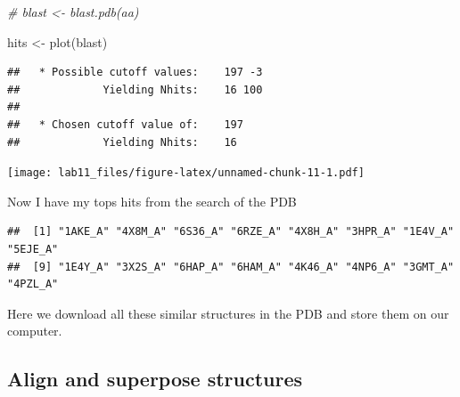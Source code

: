\documentclass[
]{article}
\newenvironment{Shaded}{\begin{snugshade}}{\end{snugshade}}
\newcommand{\CommentTok}[1]{\textcolor[rgb]{0.56,0.35,0.01}{\textit{#1}}}
\newcommand{\FunctionTok}[1]{\textcolor[rgb]{0.00,0.00,0.00}{#1}}
\newcommand{\NormalTok}[1]{#1}
\newcommand{\OtherTok}[1]{\textcolor[rgb]{0.56,0.35,0.01}{#1}}
\newcommand{\SpecialCharTok}[1]{\textcolor[rgb]{0.00,0.00,0.00}{#1}}
\begin{document}
\begin{Shaded}
\begin{Highlighting}[]
\CommentTok{\# blast \textless{}{-} blast.pdb(aa)}
\end{Highlighting}
\end{Shaded}

\begin{Shaded}
\begin{Highlighting}[]
\NormalTok{hits }\OtherTok{\textless{}{-}} \FunctionTok{plot}\NormalTok{(blast)}
\end{Highlighting}
\end{Shaded}

\begin{verbatim}
##   * Possible cutoff values:    197 -3 
##             Yielding Nhits:    16 100 
## 
##   * Chosen cutoff value of:    197 
##             Yielding Nhits:    16
\end{verbatim}

\texttt{[image: lab11\_files/figure-latex/unnamed-chunk-11-1.pdf]}

Now I have my tops hits from the search of the PDB

\begin{Shaded}
\end{Shaded}

\begin{verbatim}
##  [1] "1AKE_A" "4X8M_A" "6S36_A" "6RZE_A" "4X8H_A" "3HPR_A" "1E4V_A" "5EJE_A"
##  [9] "1E4Y_A" "3X2S_A" "6HAP_A" "6HAM_A" "4K46_A" "4NP6_A" "3GMT_A" "4PZL_A"
\end{verbatim}

Here we download all these similar structures in the PDB and store them
on our computer.

\begin{Shaded}
\end{Shaded}

\hypertarget{align-and-superpose-structures}{%
\subsection{Align and superpose
structures}\label{align-and-superpose-structures}}
\end{document}
